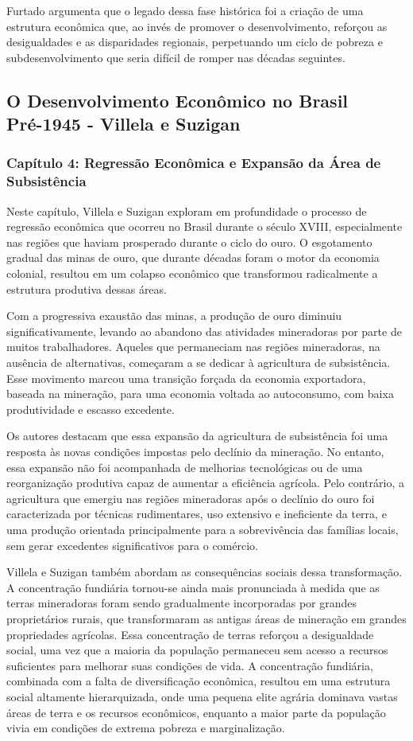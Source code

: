 \documentclass[a4paper,12pt]{article}[abntex2]
\begin{document}
Furtado argumenta que o legado dessa fase histórica foi a criação de uma estrutura econômica que, ao invés de promover o desenvolvimento, reforçou as desigualdades e as disparidades regionais, perpetuando um ciclo de pobreza e subdesenvolvimento que seria difícil de romper nas décadas seguintes.

\newpage
\subsection{\textbf{O Desenvolvimento Econômico no Brasil Pré-1945 - Villela e Suzigan}}

\subsubsection{\textbf{Capítulo 4: Regressão Econômica e Expansão da Área de Subsistência}}

Neste capítulo, Villela e Suzigan exploram em profundidade o processo de regressão econômica que ocorreu no Brasil durante o século XVIII, especialmente nas regiões que haviam prosperado durante o ciclo do ouro. O esgotamento gradual das minas de ouro, que durante décadas foram o motor da economia colonial, resultou em um colapso econômico que transformou radicalmente a estrutura produtiva dessas áreas.

Com a progressiva exaustão das minas, a produção de ouro diminuiu significativamente, levando ao abandono das atividades mineradoras por parte de muitos trabalhadores. Aqueles que permaneciam nas regiões mineradoras, na ausência de alternativas, começaram a se dedicar à agricultura de subsistência. Esse movimento marcou uma transição forçada da economia exportadora, baseada na mineração, para uma economia voltada ao autoconsumo, com baixa produtividade e escasso excedente.

Os autores destacam que essa expansão da agricultura de subsistência foi uma resposta às novas condições impostas pelo declínio da mineração. No entanto, essa expansão não foi acompanhada de melhorias tecnológicas ou de uma reorganização produtiva capaz de aumentar a eficiência agrícola. Pelo contrário, a agricultura que emergiu nas regiões mineradoras após o declínio do ouro foi caracterizada por técnicas rudimentares, uso extensivo e ineficiente da terra, e uma produção orientada principalmente para a sobrevivência das famílias locais, sem gerar excedentes significativos para o comércio.

Villela e Suzigan também abordam as consequências sociais dessa transformação. A concentração fundiária tornou-se ainda mais pronunciada à medida que as terras mineradoras foram sendo gradualmente incorporadas por grandes proprietários rurais, que transformaram as antigas áreas de mineração em grandes propriedades agrícolas. Essa concentração de terras reforçou a desigualdade social, uma vez que a maioria da população permaneceu sem acesso a recursos suficientes para melhorar suas condições de vida. A concentração fundiária, combinada com a falta de diversificação econômica, resultou em uma estrutura social altamente hierarquizada, onde uma pequena elite agrária dominava vastas áreas de terra e os recursos econômicos, enquanto a maior parte da população vivia em condições de extrema pobreza e marginalização.
\end{document}
